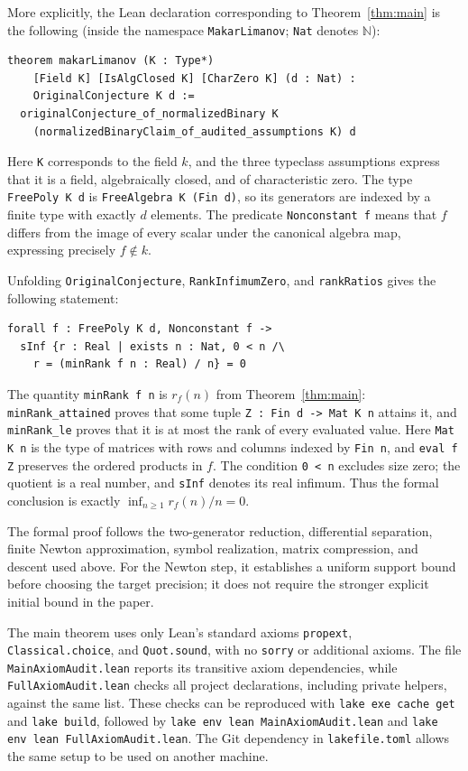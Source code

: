 \documentclass{article}
\begin{document}
More explicitly, the Lean declaration corresponding to
Theorem~\ref{thm:main} is the following (inside the namespace
\texttt{MakarLimanov}; \texttt{Nat} denotes $\mathbb N$):
\begin{verbatim}
theorem makarLimanov (K : Type*)
    [Field K] [IsAlgClosed K] [CharZero K] (d : Nat) :
    OriginalConjecture K d :=
  originalConjecture_of_normalizedBinary K
    (normalizedBinaryClaim_of_audited_assumptions K) d
\end{verbatim}
Here \texttt{K} corresponds to the field $k$, and the three typeclass
assumptions express that it is a field, algebraically closed, and of
characteristic zero. The type \texttt{FreePoly K d} is
\texttt{FreeAlgebra K (Fin d)}, so its generators are indexed by a finite
type with exactly $d$ elements. The predicate \texttt{Nonconstant f}
means that $f$ differs from the image of every scalar under the canonical
algebra map, expressing precisely $f\notin k$.

Unfolding \texttt{OriginalConjecture}, \texttt{RankInfimumZero}, and
\texttt{rankRatios} gives the following statement:
\begin{verbatim}
forall f : FreePoly K d, Nonconstant f ->
  sInf {r : Real | exists n : Nat, 0 < n /\
    r = (minRank f n : Real) / n} = 0
\end{verbatim}
The quantity \texttt{minRank f n} is $r_f(n)$ from
Theorem~\ref{thm:main}: \texttt{minRank\_attained} proves that some tuple
\texttt{Z : Fin d -> Mat K n} attains it, and \texttt{minRank\_le} proves
that it is at most the rank of every evaluated value.
Here \texttt{Mat K n} is the type of matrices with rows and columns
indexed by \texttt{Fin n}, and \texttt{eval f Z} preserves the ordered
products in $f$. The condition \texttt{0 < n} excludes size zero;
the quotient is a real number, and \texttt{sInf} denotes its real
infimum. Thus the formal conclusion is exactly
$\inf_{n\geq1} r_f(n)/n=0$.

The formal proof follows the two-generator reduction, differential separation,
finite Newton approximation, symbol realization, matrix compression, and
descent used above. For the Newton step, it establishes a uniform support
bound before choosing the target precision; it does not require the stronger
explicit initial bound in the paper.

The main theorem uses only Lean's standard axioms
\texttt{propext}, \texttt{Classical.choice}, and \texttt{Quot.sound}, with no
\texttt{sorry} or additional axioms. The file \texttt{MainAxiomAudit.lean}
reports its transitive axiom dependencies, while \texttt{FullAxiomAudit.lean}
checks all project declarations, including private helpers, against the same
list. These checks can be reproduced with \texttt{lake exe cache get} and
\texttt{lake build}, followed by
\texttt{lake env lean MainAxiomAudit.lean} and
\texttt{lake env lean FullAxiomAudit.lean}. The Git dependency in
\texttt{lakefile.toml} allows the same setup to be used on another machine.
\end{document}
